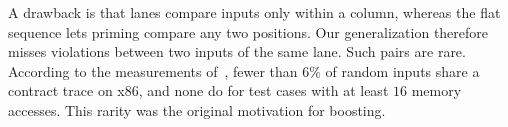 A drawback is that lanes compare inputs only within a column, whereas the flat sequence lets priming
compare any two positions. Our generalization therefore misses violations between two inputs of the
same lane. Such pairs are rare. According to the measurements of~\cite{hide_seek}, fewer than $6\%$
of random inputs share a contract trace on x86, and none do for test cases with at least $16$ memory
accesses. This rarity was the original motivation for boosting.
